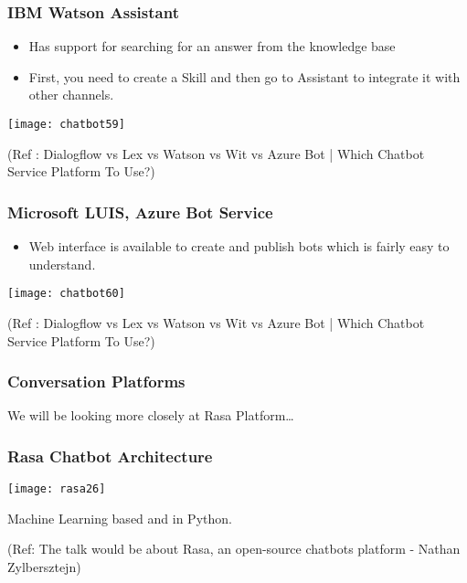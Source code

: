  \begin{frame}[fragile]\frametitle{IBM Watson Assistant}
\begin{itemize}
\item Has support for searching for an answer from the knowledge base 
\item First, you need to create a Skill and then go to Assistant to integrate it with other channels.
\end{itemize}

\begin{center}
\texttt{[image: chatbot59]}

\tiny{(Ref : Dialogflow vs Lex vs Watson vs Wit vs Azure Bot | Which Chatbot Service Platform To Use?)}
\end{center}
\end{frame}

 \begin{frame}[fragile]\frametitle{Microsoft LUIS, Azure Bot Service}
\begin{itemize}
\item Web interface is available to create and publish bots which is fairly easy to understand.
\end{itemize}

\begin{center}
\texttt{[image: chatbot60]}

\tiny{(Ref : Dialogflow vs Lex vs Watson vs Wit vs Azure Bot | Which Chatbot Service Platform To Use?)}
\end{center}
\end{frame}


 \begin{frame}[fragile]\frametitle{Conversation Platforms}
We will be looking more closely at Rasa Platform\ldots
\end{frame}

\begin{frame}[fragile]\frametitle{Rasa Chatbot Architecture}


\begin{center}
\texttt{[image: rasa26]}
\end{center}

Machine Learning based and in Python.

{\tiny (Ref: The talk would be about Rasa, an open-source chatbots platform - Nathan Zylbersztejn)}

\end{frame}



